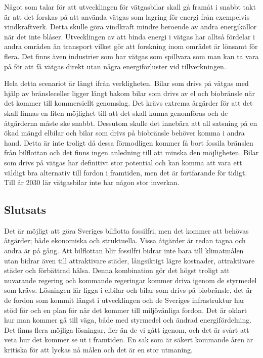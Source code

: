 \documentclass[a4paper,11pt,fleqn, titlepage]{article}
\begin{document}
Något som talar för att utvecklingen för vätgasbilar skall gå framåt i snabbt takt är att det forskas på att använda vätgas som lagring för energi från exempelvis vindkraftverk. Detta skulle göra vindkraft mindre beroende av andra energikällor när det inte blåser. Utvecklingen av att binda energi i vätgas har alltså fördelar i andra områden än transport vilket gör att forskning inom området är lönsamt för flera. Det finns även industrier som har vätgas som spillvara som man kan ta vara på för att få vätgas direkt utan några energiförluster vid tillverkningen.

Hela detta scenariot är långt ifrån verkligheten. Bilar som drivs på vätgas med hjälp av bränsleceller ligger långt bakom bilar som drivs av el och biobränsle när det kommer till kommersiellt genomslag. Det krävs extrema årgärder för att det skall finnas en liten möjlighet till att det skall kunna genomföras och de åtgärderna måste ske snabbt. Dessutom skulle det innebära att all satsning på en ökad mängd elbilar och bilar som drivs på biobränsle behöver komma i andra hand. Detta är inte troligt då dessa förmodligen kommer få bort fossila bränslen från bilflottan och det finns ingen anledning till att minska den möjligheten. Bilar som drivs på vätgas har definitivt stor potential och kan komma att vara ett väldigt bra alternativ till fordon i framtiden, men det är fortfarande för tidigt. Till år 2030 lär vätgasbilar inte har någon stor inverkan.

\subsection{Slutsats}
Det är möjligt att göra Sveriges bilflotta fossilfri, men det kommer att behövas åtgärder; både ekonomiska och struktuella. Vissa åtgärder är redan tagna och andra är på gång. Att bilflottan blir fossilfri bidrar inte bara till klimatmålen utan bidrar även till attraktivare städer, långsiktigt lägre kostnader, attraktivare städer och förbättrad hälsa. Denna kombination gör det högst troligt att nuvarande regering och kommande regeringar kommer driva igenom de styrmedel som krävs. Lösningen lär ligga i elbilar och bilar som drivs på biobränsle, det är de fordon som kommit längst i utvecklingen och de Sveriges infrastruktur har stöd för och en plan för när det kommer till miljövänliga fordon. Det är oklart hur man kommer gå till väga, både med styrmedel och ändrad energifördelning. Det finns flera möjliga lösningar, fler än de vi gått igenom, och det är svårt att veta hur det kommer se ut i framtiden. En sak som är säkert kommande åren är kritiska för att lyckas nå målen och det är en stor utmaning.
\newpage
\printbibliography
\end{document}
